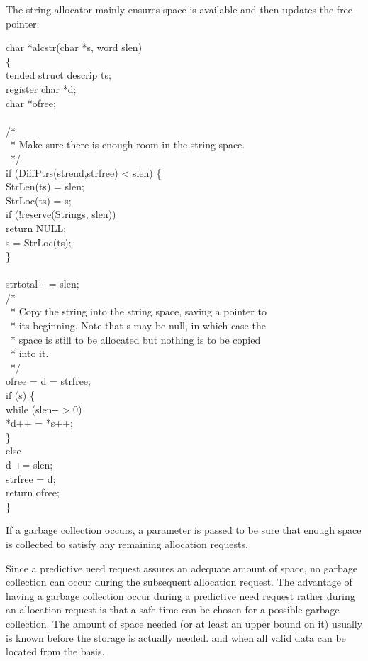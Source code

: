 The string allocator mainly ensures space is available and then
updates the free pointer:

\begin{iconcode}
\>char *alcstr(char *s, word slen)\\
\>\{\\
\>tended struct descrip ts;\\
\>register char *d;\\
\>char *ofree;\\
\\
\>/*\\
\>\ * Make sure there is enough room in the string space.\\
\>\ */\\
\>if (DiffPtrs(strend,strfree) < slen) \{\\
\>\>StrLen(ts) = slen;\\
\>\>StrLoc(ts) = s;\\
\>\>if (!reserve(Strings, slen))\\
\>\>\>return NULL;\\
\>\>s = StrLoc(ts);\\
\>\>\}\\
\\
\>strtotal += slen;\\
\>/*\\
\>\ * Copy the string into the string space, saving a pointer to\\
\>\ * its beginning. Note that s may be null, in which case the\\
\>\ * space is still to be allocated but nothing is to be copied\\
\>\ * into it.\\
\>\ */\\
\>ofree = d = strfree;\\
\>if (s) \{\\
\>\>while (slen-{}- > 0)\\
\>\>*d++ = *s++;\\
\>\>\}\\
\>else\\
\>\>d += slen;\\
\>strfree = d;\\
\>return ofree;\\
\>\}
\end{iconcode}

If a garbage collection occurs, a parameter is passed to be sure that
enough space is collected to satisfy any remaining allocation
requests.

Since a predictive need request assures an adequate amount of space,
no garbage collection can occur during the subsequent allocation
request. The advantage of having a garbage collection occur during a
predictive need request rather during an allocation request is that a
safe time can be chosen for a possible garbage collection. The amount
of space needed (or at least an upper bound on it) usually is known
before the storage is actually needed. and when all valid data can be
located from the basis.

